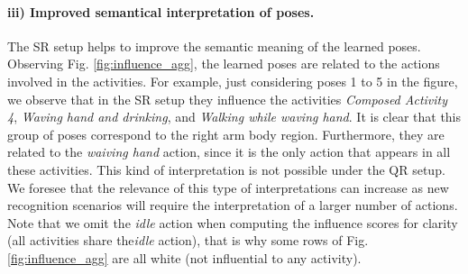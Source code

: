 \paragraph{iii) Improved semantical interpretation of poses.}
The SR setup helps to improve the semantic meaning of the learned poses.
Observing Fig. \ref{fig:influence_agg}, the learned poses are
related to the actions involved in the activities. For example, just considering
poses 1 to 5 in the figure, we observe that in the SR setup they influence
the activities \emph{Composed Activity 4}, \emph{Waving hand and drinking}, and
\emph{Walking while waving hand}. It is clear that this 
group of poses correspond to the
right arm body region. Furthermore, they are related to the \emph{waiving hand} action, since 
it is the only
action that appears in all these activities. This kind of interpretation is not
possible under the QR setup. We foresee that the relevance of this type of interpretations can 
increase as new recognition scenarios will require the interpretation
of a larger number of actions. Note that we omit the \emph{idle} action when computing the influence scores for clarity (all activities share the\emph{idle} action), that is why some rows of Fig. \ref{fig:influence_agg} are all white (not influential to any activity).






